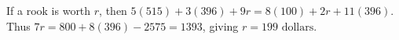 If a rook is worth $r$, then $5(515)+3(396)+9r=8(100)+2r+11(396)$. Thus $7r=800+8(396)-2575=1393$, giving $\boxed{r=199\text{ dollars}}$.
